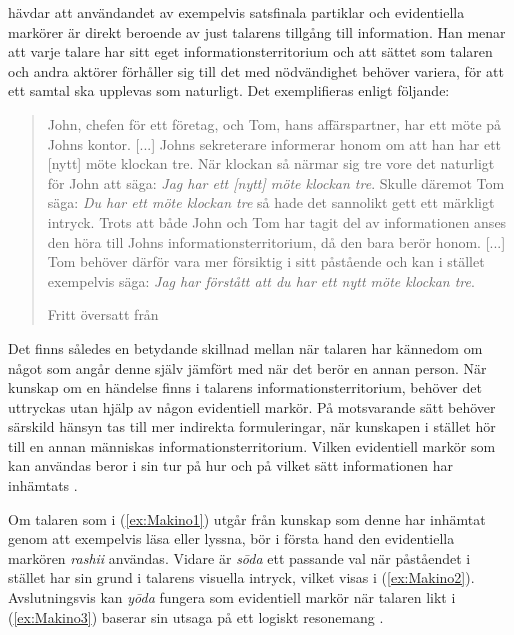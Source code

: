 \documentclass[12pt,a4paper]{article}
\begin{document}
\textcite{kamio1994,kamio1995} hävdar att användandet av exempelvis satsfinala partiklar och evidentiella markörer är direkt beroende av just talarens tillgång till information. Han menar att varje talare har sitt eget informationsterritorium och att sättet som talaren och andra aktörer förhåller sig till det med nödvändighet behöver variera, för att ett samtal ska upplevas som naturligt. Det exemplifieras enligt följande:

\blockquote[{Fritt översatt från \cite[315]{hasegawa2015}}]{John, chefen för ett företag, och Tom, hans affärspartner, har ett möte på Johns kontor. [...] Johns sekreterare informerar honom om att han har ett [nytt] möte klockan tre. När klockan så närmar sig tre vore det naturligt för John att säga: \emph{Jag har ett [nytt] möte klockan tre}. Skulle däremot Tom säga: \emph{Du har ett möte klockan tre} så hade det sannolikt gett ett märkligt intryck. Trots att både John och Tom har tagit del av informationen anses den höra till Johns informationsterritorium, då den bara berör honom. [...] Tom behöver därför vara mer försiktig i sitt påstående och kan i stället exempelvis säga: \emph{Jag har förstått att du har ett nytt möte klockan tre}.}

\noindent
Det finns således en betydande skillnad mellan när talaren har kännedom om något som angår denne själv jämfört med när det berör en annan person. När kunskap om en händelse finns i talarens informationsterritorium, behöver det uttryckas utan hjälp av någon evidentiell markör. På motsvarande sätt behöver särskild hänsyn tas till mer indirekta formuleringar, när kunskapen i stället hör till en annan människas informationsterritorium. Vilken evidentiell markör som kan användas beror i sin tur på hur och på vilket sätt informationen har inhämtats \autocite{kamio1994,kamio1995,hasegawa2015,shibatani1990}.

Om talaren som i (\ref{ex:Makino1}) utgår från kunskap som denne har inhämtat genom att exempelvis läsa eller lyssna, bör i första hand den evidentiella markören \emph{rashii} användas. Vidare är \emph{s\=oda} ett passande val när påståendet i stället har sin grund i talarens visuella intryck, vilket visas i (\ref{ex:Makino2}). Avslutningsvis kan \emph{y\=oda} fungera som evidentiell markör när talaren likt i (\ref{ex:Makino3}) baserar sin utsaga på ett logiskt resonemang \autocite{makino1986}.
\end{document}
